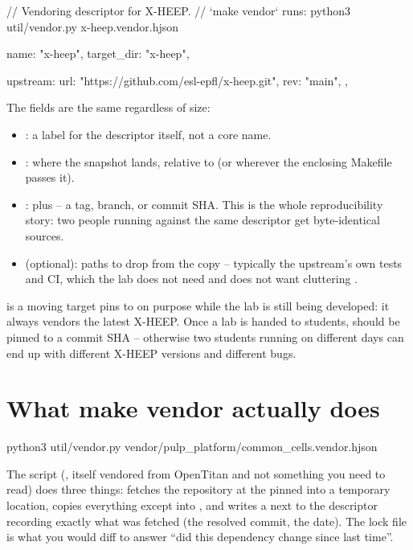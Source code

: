 \begin{corecode}[caption={lab0/x-heep.vendor.hjson (the whole file)},label={lst:vendoring:xheep}]
// Vendoring descriptor for X-HEEP.
// `make vendor` runs: python3 util/vendor.py x-heep.vendor.hjson
{
  name: "x-heep",
  target_dir: "x-heep",

  upstream: {
    url: "https://github.com/esl-epfl/x-heep.git",
    rev: "main",
  },
}
\end{corecode}

The fields are the same regardless of size:

\begin{itemize}
  \item {}: a label for the descriptor itself, not a \FuseSoC core
        name.
  \item {}: where the snapshot lands, relative to
         (or wherever the enclosing Makefile passes it).
  \item {}:  plus  -- a tag, branch, or commit
        SHA. This is the whole reproducibility story: two people running
         against the same descriptor get byte-identical
        sources.
  \item {} (optional): paths to drop from the
        copy -- typically the upstream's own tests and CI, which the lab
        does not need and does not want cluttering .
\end{itemize}

\begin{gotcha}{ is a moving target}
 pins to  on purpose while the lab is
still being developed: it always vendors the latest X-HEEP. Once a lab is
handed to students,  should be pinned to a commit SHA -- otherwise
two students running  on different days can end up with
different X-HEEP versions and different bugs.
\end{gotcha}

\section{What make vendor actually does}

\begin{shcode}
python3 util/vendor.py vendor/pulp_platform/common_cells.vendor.hjson
\end{shcode}

The script (, itself vendored from OpenTitan and not
something you need to read) does three things: fetches the repository at the
pinned  into a temporary location, copies everything except
 into , and writes a
 next to the descriptor recording exactly what was
fetched (the resolved commit, the date). The lock file is what you would
diff to answer ``did this dependency change since last time''.


